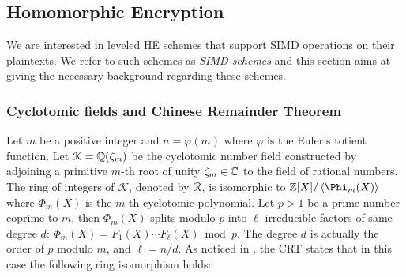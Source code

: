 


\subsection{Homomorphic Encryption}
We are interested in leveled HE schemes that support SIMD operations on their plaintexts. We refer to such schemes as \emph{SIMD-schemes} and this section aims at giving the necessary background regarding these schemes.

\subsubsection{Cyclotomic fields and Chinese Remainder Theorem}\label{subsec:crt}

Let $m$ be a positive integer and $n = \varphi(m)$ where $\varphi$ is the Euler's totient function. 
Let $\mathcal{K} = \mathbb{Q}(\zeta_{m})$ be the cyclotomic number field constructed by adjoining a primitive $m$-th root of unity $\zeta_{m}\in\mathbb{C}$ to the field of rational numbers. 
The ring of integers of $\mathcal{K}$, denoted by $\mathcal{R}$, is isomorphic to $\Z[X]/\ideal{\Phi_m(X)}$ where $\Phi_m(X)$ is the $m$-th cyclotomic polynomial. Let $p>1$ be a prime number coprime to $m$, then $\Phi_m(X)$ splits modulo $p$ into $\ell$ irreducible factors of same degree $d$: $\Phi_m(X) = F_1(X)\cdots F_\ell(X) \bmod p$. The degree $d$ is actually the order of $p$ modulo $m$, and $\ell = n/d$. As noticed in \cite{SV14}, the \ac{CRT} states that in this case the following ring isomorphism holds:


